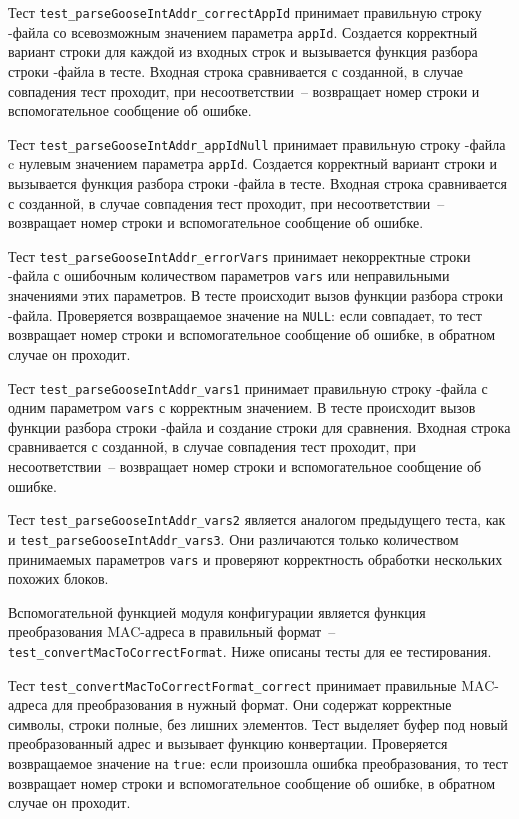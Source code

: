 Тест \lstinline{test_parseGooseIntAddr_correctAppId} принимает правильную строку \cid-файла со всевозможным значением параметра \lstinline{appId}. Создается корректный вариант строки для каждой из входных строк и вызывается функция разбора строки \cid-файла в тесте. Входная строка сравнивается с созданной, в случае совпадения тест проходит, при несоответствии~-- возвращает номер строки и вспомогательное сообщение об ошибке.

Тест \lstinline{test_parseGooseIntAddr_appIdNull} принимает правильную строку \cid-файла c нулевым значением параметра \lstinline{appId}. Создается корректный вариант строки и вызывается функция разбора строки \cid-файла в тесте. Входная строка сравнивается с созданной, в случае совпадения тест проходит, при несоответствии~-- возвращает номер строки и вспомогательное сообщение об ошибке.

Тест \lstinline{test_parseGooseIntAddr_errorVars} принимает некорректные строки \cid-файла с ошибочным количеством параметров \lstinline{vars} или неправильными значениями этих параметров. В тесте происходит вызов функции разбора строки \cid-файла. Проверяется возвращаемое значение на \lstinline{NULL}: если совпадает, то тест возвращает номер строки и вспомогательное сообщение об ошибке, в обратном случае он проходит.

Тест \lstinline{test_parseGooseIntAddr_vars1} принимает правильную строку \cid-файла с одним параметром \lstinline{vars} с корректным значением. В тесте происходит вызов функции разбора строки \cid-файла и создание строки для сравнения. Входная строка сравнивается с созданной, в случае совпадения тест проходит, при несоответствии~-- возвращает номер строки и вспомогательное сообщение об ошибке.

Тест \lstinline{test_parseGooseIntAddr_vars2} является аналогом предыдущего
теста, как и \lstinline{test_parseGooseIntAddr_vars3}. Они различаются только
количеством принимаемых параметров \lstinline{vars} и проверяют корректность
обработки нескольких похожих блоков.

Вспомогательной функцией модуля конфигурации является функция преобразования MAC-адреса в правильный формат~-- \lstinline{test_convertMacToCorrectFormat}. Ниже описаны тесты для ее тестирования.

Тест \lstinline{test_convertMacToCorrectFormat_correct} принимает правильные MAC-адреса для преобразования в нужный формат. Они содержат корректные символы, строки полные, без лишних элементов. Тест выделяет буфер под новый преобразованный адрес и вызывает функцию конвертации. Проверяется возвращаемое значение на \lstinline{true}: если произошла ошибка преобразования, то тест возвращает номер строки и вспомогательное сообщение об ошибке, в обратном случае он проходит.

